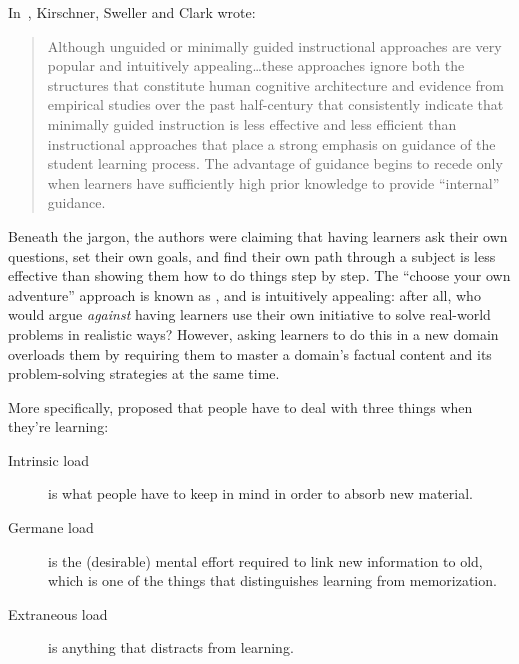 
In~\cite{Kirs2006}, Kirschner, Sweller and Clark wrote:

\begin{quote}

  Although unguided or minimally guided instructional approaches
  are very popular and intuitively appealing{\ldots}these approaches ignore
  both the structures that constitute human cognitive architecture
  and evidence from empirical studies over the past half-century
  that consistently indicate that minimally guided instruction is less effective and less efficient
  than instructional approaches that place a strong emphasis on guidance of the student learning process.
  The advantage of guidance begins to recede
  only when learners have sufficiently high prior knowledge to provide ``internal'' guidance.

\end{quote}

Beneath the jargon,
the authors were claiming that having learners ask their own questions,
set their own goals,
and find their own path through a subject
is less effective than showing them how to do things step by step.
The ``choose your own adventure'' approach is known as ,
and is intuitively appealing:
after all,
who would argue \emph{against} having learners use their own initiative
to solve real-world problems in realistic ways?
However,
asking learners to do this in a new domain overloads them
by requiring them to master a domain's factual content
and its problem-solving strategies
at the same time.

More specifically,
 proposed that
people have to deal with three things when they're learning:

\begin{description}

\item[Intrinsic load]
  is what people have to keep in mind in order to absorb new material.

\item[Germane load]
  is the (desirable) mental effort required to link new information to old,
  which is one of the things that distinguishes learning from memorization.

\item[Extraneous load]
  is anything that distracts from learning.

\end{description}

